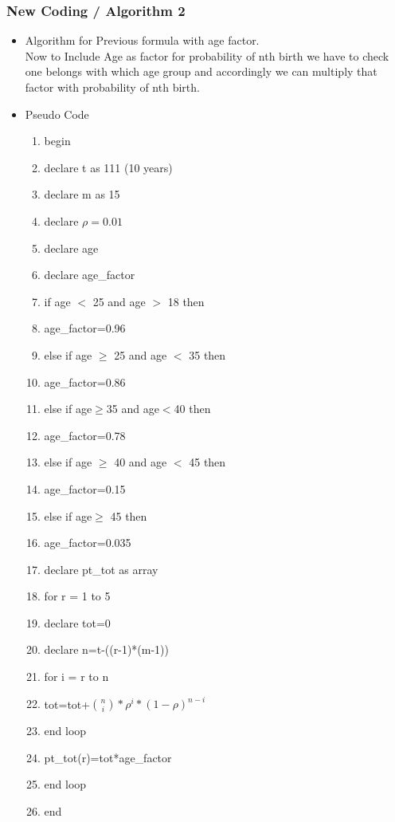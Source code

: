 \documentclass{article}
\begin{document}
\subsubsection{New Coding / Algorithm 2}
\begin{itemize}
    \item Algorithm for Previous formula with age factor.\\
    Now to Include Age as factor for probability of nth birth we have to check one belongs with which age group and accordingly we can multiply that factor with probability of nth birth.  
    \item Pseudo Code\\
    \begin{enumerate}
    \item begin
    \item declare t as 111 (10 years)
    \item declare m as 15
    \item declare $\rho=0.01$
    \item declare age
    \item declare age\_factor
    \item if age $<$ 25 and age $>$ 18 then
    \item age\_factor=0.96
    \item else if age $\geq$ 25 and age $<$ 35 then
    \item age\_factor=0.86
    \item else if age$\geq$35 and age$<$40 then
    \item age\_factor=0.78
    \item else if age $\geq$ 40 and age $<$ 45 then
    \item age\_factor=0.15
    \item else if age$\geq$ 45 then
    \item age\_factor=0.035
    \item declare pt\_tot as array
    \item for r = 1  to 5
    \item declare tot=0
    \item declare n=t-((r-1)*(m-1))
    \item for i = r to n
    \item tot=tot+$\binom{n}{i}*\rho^i*(1-\rho)^{n-i}$
    \item end loop
    \item pt\_tot(r)=tot*age\_factor
    \item end loop
    \item end
    \end{enumerate}
\end{itemize}
\newpage
\end{document}

